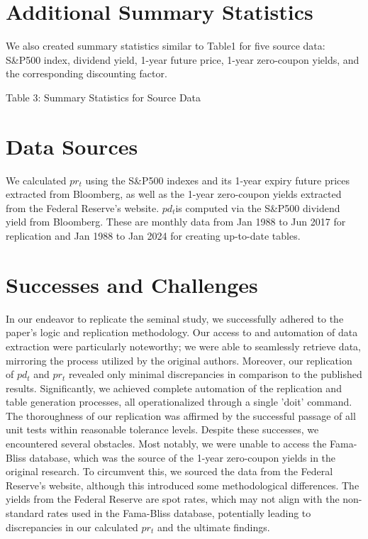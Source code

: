 \documentclass{article}
\begin{document}
\section{Additional Summary Statistics}
We also created summary statistics similar to Table1 for five source data: 
S\&P500 index, dividend yield, 1-year future price, 1-year 
zero-coupon yields, and the corresponding discounting factor.

\begin{table}[H]
\centering

\caption*{Table 3: Summary Statistics for Source Data}
\label{tab:your_label}
\end{table}    


\section{Data Sources}
We calculated \(pr_t\) using the S\&P500 indexes and its 1-year expiry 
future prices extracted from Bloomberg, as well as the 1-year zero-coupon 
yields extracted from the Federal Reserve’s website. \(pd_t \)is 
computed via the S\&P500 dividend yield from Bloomberg. These are 
monthly data from Jan 1988 to Jun 2017 for replication and Jan 1988 
to Jan 2024 for creating up-to-date tables.

\section{Successes and Challenges}
In our endeavor to replicate the seminal study, we successfully 
adhered to the paper's logic and replication methodology. Our access 
to and automation of data extraction were particularly noteworthy; 
we were able to seamlessly retrieve data, mirroring the process utilized 
by the original authors. Moreover, our replication of $pd_t$ and $pr_t$ 
revealed only minimal discrepancies in comparison to the published results. 
Significantly, we achieved complete automation of the replication and 
table generation processes, all operationalized through a single 'doit' 
command. The thoroughness of our replication was affirmed by the 
successful passage of all unit tests within reasonable tolerance levels.
\newline
\newline
Despite these successes, we encountered several obstacles. Most notably, 
we were unable to access the Fama-Bliss database, which was the 
source of the 1-year zero-coupon yields in the original research. To 
circumvent this, we sourced the data from the Federal Reserve's website, 
although this introduced some methodological differences. The yields 
from the Federal Reserve are spot rates, which may not align with the 
non-standard rates used in the Fama-Bliss database, potentially leading 
to discrepancies in our calculated $pr_t$ and the ultimate findings. 
\end{document}
